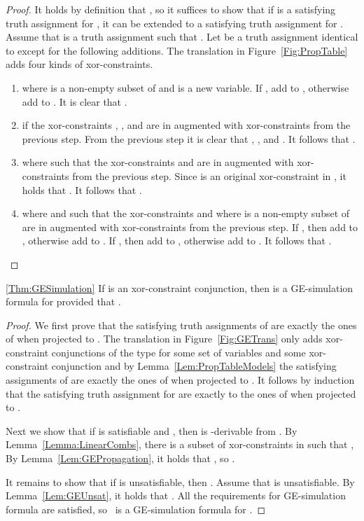 \begin{proof}
It holds by definition that , so it suffices to show that if  is a satisfying truth
assignment for , it can be extended to a satisfying truth
assignment  for . 
Assume that  is a truth assignment such that .
Let  be a truth assignment identical to  except for the following additions. The translation  in Figure~\ref{Fig:PropTable} adds four kinds of xor-constraints.
\begin{enumerate}
\item  where  is a non-empty subset of 
and  is a new variable. If , add  to , otherwise add  to . It is clear that .

\item  if the xor-constraints , , and  are in  augmented with xor-constraints from the
previous step.
From the previous step it is clear that , , and
. It follows that .

\item  where  such that
the xor-constraints  and  are in  augmented with xor-constraints from the previous step. Since  is an original xor-constraint in ,
    it holds that . It follows that .

\item  where  and  such that
the xor-constraints  and  where  is a non-empty subset of 
are in  augmented with xor-constraints from the previous step. If , then add  to , otherwise add  to . If , then add  to , otherwise add  to .
It follows that .
\end{enumerate}
\end{proof}

\begin{retheorem}{\ref{Thm:GESimulation}} 
If  is an xor-constraint
conjunction, then  is a GE-simulation formula for
 provided that .
\end{retheorem}

\begin{proof}
We first prove that the satisfying truth assignments of  are
exactly the ones of  when
projected to . 
The translation \getransname{} in Figure~\ref{Fig:GETrans} only adds xor-constraint
conjunctions of the type  for some set of variables  and some xor-constraint conjunction 
and by Lemma~\ref{Lem:PropTableModels} the satisfying assignments
of  are exactly the ones of  
when projected to .
It follows by induction that the satisfying truth assignment for 
are exactly to the ones of  when projected to .

Next we show that if  is satisfiable 
and 
 , then  is -derivable from . 
By Lemma~\ref{Lemma:LinearCombs}, there is a subset  of xor-constraints in  such that ,
By Lemma~\ref{Lem:GEPropagation}, it holds that 
, so .

It remains to show that if  is unsatisfiable,
   then . Assume that 
    is unsatisfiable. By Lemma~\ref{Lem:GEUnsat}, it holds
   that .
All the requirements for GE-simulation formula are satisfied, so  is a GE-simulation formula for .
\end{proof}

